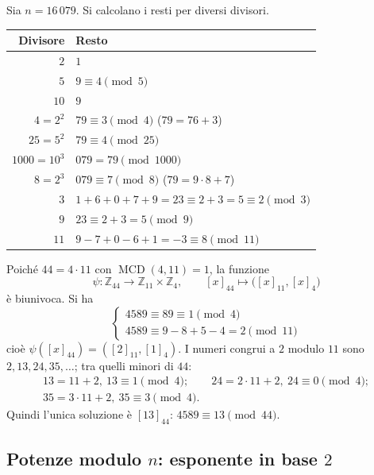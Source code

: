 \documentclass[11pt,a4paper]{article}
\begin{document}
\begin{esempio}
Sia $n = 16\,079$. Si calcolano i resti per diversi divisori.
\begin{center}
\begin{tabular}{rl}
\toprule
Divisore & Resto \\
\midrule
$2$ & $1$ \\
$5$ & $9 \equiv 4 \pmod 5$ \\
$10$ & $9$ \\
$4 = 2^2$ & $79 \equiv 3 \pmod 4$ \quad ($79 = 76 + 3$) \\
$25 = 5^2$ & $79 \equiv 4 \pmod{25}$ \\
$1000 = 10^3$ & $079 = 79 \pmod{1000}$ \\
$8 = 2^3$ & $079 \equiv 7 \pmod 8$ \quad ($79 = 9\cdot 8 + 7$) \\
$3$ & $1 + 6 + 0 + 7 + 9 = 23 \equiv 2 + 3 = 5 \equiv 2 \pmod 3$ \\
$9$ & $23 \equiv 2 + 3 = 5 \pmod 9$ \\
$11$ & $9 - 7 + 0 - 6 + 1 = -3 \equiv 8 \pmod{11}$ \\
\bottomrule
\end{tabular}
\end{center}
\end{esempio}

\begin{esempio}
Poiché $44 = 4\cdot 11$ con $\operatorname{MCD}(4, 11) = 1$, la funzione
\[
  \psi : \mathbb{Z}_{44} \to \mathbb{Z}_{11}\times\mathbb{Z}_4, \qquad [x]_{44} \mapsto \big([x]_{11}, [x]_4\big)
\]
è biunivoca. Si ha
\[
  \begin{cases} 4589 \equiv 89 \equiv 1 \pmod 4 \\ 4589 \equiv 9 - 8 + 5 - 4 = 2 \pmod{11} \end{cases}
\]
cioè $\psi([x]_{44}) = ([2]_{11}, [1]_4)$. I numeri congrui a $2$ modulo $11$ sono $2, 13, 24, 35, \dots$; tra quelli minori di $44$:
\[
  \begin{gathered}
  13 = 11 + 2,\ 13 \equiv 1 \pmod 4; \qquad 24 = 2\cdot 11 + 2,\ 24 \equiv 0 \pmod 4;\\
  35 = 3\cdot 11 + 2,\ 35 \equiv 3 \pmod 4 .
  \end{gathered}
\]
Quindi l'unica soluzione è $[13]_{44}$: $4589 \equiv 13 \pmod{44}$.
\end{esempio}

\subsection{Potenze modulo $n$: esponente in base $2$}
\end{document}

